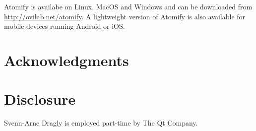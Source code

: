 \documentclass[aps,pre,twocolumn,letterpaper,floatfix,nofootinbib]{revtex4}
\begin{document}
Atomify is availabe on Linux, MacOS and Windows and can be downloaded from
\href{https://ovilab.net/atomify}{http://ovilab.net/atomify}.
A lightweight version of Atomify is also available for mobile devices running
Android or iOS.

\section{Acknowledgments}

\section{Disclosure}

Svenn-Arne Dragly is employed part-time by The Qt Company.


\end{document}
